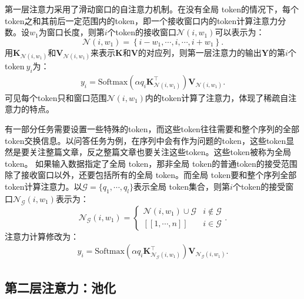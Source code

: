 第一层注意力采用了滑动窗口的自注意力机制。在没有全局 token的情况下，每个token之和其前后一定范围内的token，即一个接收窗口内的token计算注意力分数。设$w_1$为窗口长度，则第$i$个token的接收窗口$\mathcal{N}{(i,w_1)}$可以表示为：
\begin{equation}
    \mathcal{N}{(i,w_1)} = \left\{ i - w_1,\cdots, i, \cdots, i + w_1  \right\}.
\label{eq.receptivefield}
\end{equation}
用$\mathbf{K}_{\mathcal{N}{(i,w_1)}}$和$\mathbf{V}_{\mathcal{N}{(i,w_1)}}$来表示$\mathbf{K}$和$\mathbf{V}$的对应列，则第一层注意力的输出$\mathbf{Y}$的第$i$个token$\ y_i$为：
\begin{align}
y_i = \text{Softmax}\left( \alpha q_i \mathbf{K}_{\mathcal{N}{(i,w_1)}}^\top \right) \mathbf{V}_{\mathcal{N}{(i,w_1)}}.
\label{eq:first_att}
\end{align}
可见每个token只和窗口范围$\mathcal{N}{(i,w_1)}$内的token计算了注意力，体现了稀疏自注意力的特点。

有一部分任务需要设置一些特殊的token，而这些token往往需要和整个序列的全部token交换信息。以问答任务为例，在序列中会有作为问题的token，这些token显然是要关注整篇文章，反之整篇文章也要关注这些token。这些token被称为全局 token。
如果输入数据指定了全局 token，那非全局 token的普通token的接受范围除了接收窗口以外，还要包括所有的全局 token。而全局 token要和整个序列全部token计算注意力。以$\mathcal{G} = \{ q_1, \cdots, q_l \}$表示全局 token集合，则第$i$个token的接受窗口$\mathcal{N_G}(i, w_1)$表示为：
\begin{equation}
\mathcal{N_G}(i, w_1) =
\begin{cases}
 \mathcal{N}(i, w_1) \cup \mathcal{G} & i \notin \mathcal{G} \\
 [\![1, \cdots,n]\!] & i \in \mathcal{G}
\end{cases}.
\label{eq:first_win_glb}
\end{equation}
注意力计算修改为：
\begin{align}
y_i = \text{Softmax}\left( \alpha q_i \mathbf{K}_{\mathcal{N_G}{(i,w_1)}}^\top \right) \mathbf{V}_{\mathcal{N_G}{(i,w_1)}}.
\label{eq:first_att_global}
\end{align}

\subsection{第二层注意力：池化}

